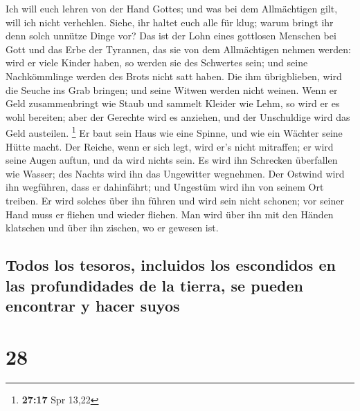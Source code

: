 Ich will euch lehren von der Hand Gottes; und was bei
dem Allmächtigen gilt, will ich nicht verhehlen.  Siehe,
ihr haltet euch alle für klug; warum bringt ihr denn solch unnütze Dinge
vor?  Das ist der Lohn eines gottlosen Menschen bei Gott
und das Erbe der Tyrannen, das sie von dem Allmächtigen nehmen werden:
 wird er viele Kinder haben, so werden sie des Schwertes
sein; und seine Nachkömmlinge werden des Brots nicht satt haben.
 Die ihm übrigblieben, wird die Seuche ins Grab bringen;
und seine Witwen werden nicht weinen.  Wenn er Geld
zusammenbringt wie Staub und sammelt Kleider wie Lehm, 
so wird er es wohl bereiten; aber der Gerechte wird es anziehen, und der
Unschuldige wird das Geld austeilen. \footnote{\textbf{27:17} Spr 13,22}
 Er baut sein Haus wie eine Spinne, und wie ein Wächter
seine Hütte macht.  Der Reiche, wenn er sich legt, wird
er's nicht mitraffen; er wird seine Augen auftun, und da wird nichts
sein.  Es wird ihn Schrecken überfallen wie Wasser; des
Nachts wird ihn das Ungewitter wegnehmen.  Der Ostwind
wird ihn wegführen, dass er dahinfährt; und Ungestüm wird ihn von seinem
Ort treiben.  Er wird solches über ihn führen und wird
sein nicht schonen; vor seiner Hand muss er fliehen und wieder fliehen.
 Man wird über ihn mit den Händen klatschen und über ihn
zischen, wo er gewesen ist.

\hypertarget{todos-los-tesoros-incluidos-los-escondidos-en-las-profundidades-de-la-tierra-se-pueden-encontrar-y-hacer-suyos}{%
\subsection{Todos los tesoros, incluidos los escondidos en las
profundidades de la tierra, se pueden encontrar y hacer
suyos}\label{todos-los-tesoros-incluidos-los-escondidos-en-las-profundidades-de-la-tierra-se-pueden-encontrar-y-hacer-suyos}}

\hypertarget{section-27}{%
\section{28}\label{section-27}}

